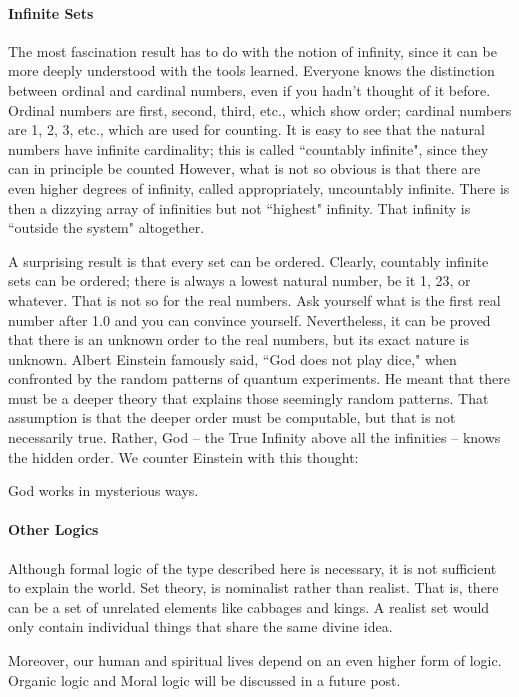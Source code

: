 \paragraph{Infinite Sets}
The most fascination result has to do with the notion of infinity, since it can be more deeply understood with the tools learned. Everyone knows the distinction between ordinal and cardinal numbers, even if you hadn't thought of it before. Ordinal numbers are first, second, third, etc., which show order; cardinal numbers are 1, 2, 3, etc., which are used for counting. It is easy to see that the natural numbers have infinite cardinality; this is called ``countably infinite", since they can in principle be counted However, what is not so obvious is that there are even higher degrees of infinity, called appropriately, uncountably infinite. There is then a dizzying array of infinities but not ``highest" infinity. That infinity is ``outside the system" altogether.

A surprising result is that every set can be ordered. Clearly, countably infinite sets can be ordered; there is always a lowest natural number, be it 1, 23, or whatever. That is not so for the real numbers. Ask yourself what is the first real number after 1.0 and you can convince yourself. Nevertheless, it can be proved that there is an unknown order to the real numbers, but its exact nature is unknown. Albert Einstein famously said, ``God does not play dice," when confronted by the random patterns of quantum experiments. He meant that there must be a deeper theory that explains those seemingly random patterns. That assumption is that the deeper order must be computable, but that is not necessarily true. Rather, God – the True Infinity above all the infinities – knows the hidden order. We counter Einstein with this thought:

\begin{quotex}
God works in mysterious ways.

\end{quotex}
\paragraph{Other Logics}
Although formal logic of the type described here is necessary, it is not sufficient to explain the world. Set theory, is nominalist rather than realist. That is, there can be a set of unrelated elements like cabbages and kings. A realist set would only contain individual things that share the same divine idea.

Moreover, our human and spiritual lives depend on an even higher form of logic. Organic logic and Moral logic will be discussed in a future post.

